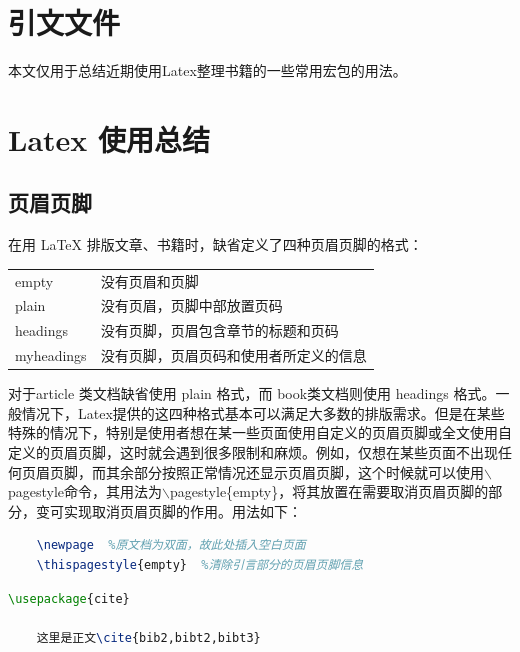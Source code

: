 \documentclass[12pt]{book}
\begin{document}
\section{引文文件}

本文仅用于总结近期使用Latex整理书籍的一些常用宏包的用法。

\section*{Latex 使用总结}

\subsection{页眉页脚}

在用 LaTeX 排版文章、书籍时，缺省定义了四种页眉页脚的格式：

\begin{table}[h]
	\centering
	\begin{tabular}{ll}
		empty      & 没有页眉和页脚              \\
		plain      & 没有页眉，页脚中部放置页码        \\
		headings   & 没有页脚，页眉包含章节的标题和页码    \\
		myheadings & 没有页脚，页眉页码和使用者所定义的信息 
	\end{tabular}
\end{table}

对于article 类文档缺省使用 plain 格式，而 book类文档则使用 headings 格式。一般情况下，Latex提供的这四种格式基本可以满足大多数的排版需求。但是在某些特殊的情况下，特别是使用者想在某一些页面使用自定义的页眉页脚或全文使用自定义的页眉页脚，这时就会遇到很多限制和麻烦。例如，仅想在某些页面不出现任何页眉页脚，而其余部分按照正常情况还显示页眉页脚，这个时候就可以使用$\backslash$pagestyle命令，其用法为$\backslash$pagestyle\{empty\}，将其放置在需要取消页眉页脚的部分，变可实现取消页眉页脚的作用。用法如下：
\begin{lstlisting}[language=tex]
	%   %引言部分
	\newpage  %原文档为双面，故此处插入空白页面
	\thispagestyle{empty}  %清除引言部分的页眉页脚信息
\end{lstlisting}
\begin{lstlisting}[language=tex]
	\usepackage{cite}
	
	这里是正文\cite{bib2,bibt2,bibt3}
\end{lstlisting}
\end{document}
